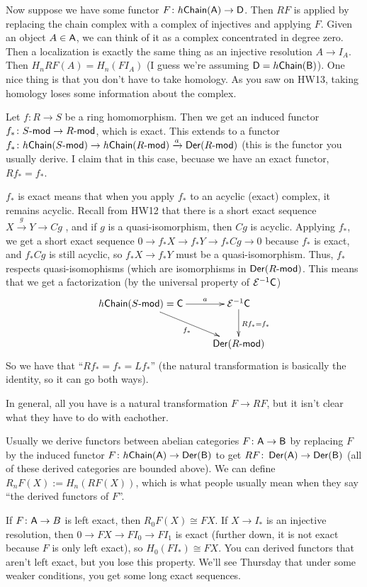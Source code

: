 Now suppose we have some functor $F\colon h\chain(\A)\to \D$. Then $RF$ is applied by replacing the chain complex with a complex of injectives and applying $F$. Given an object $A\in \A$, we can think of it as a complex concentrated in degree zero. Then a localization is exactly the same thing as an injective resolution $A\to I_A$. Then $H_nRF(A)=H_n(F I_A)$ (I guess we're assuming $\D=h\chain(\B)$). One nice thing is that you don't have to take homology. As you saw on HW13, taking homology loses some information about the complex.
\begin{example}
 Let $f\colon R\to S$ be a ring homomorphism. Then we get an induced functor $f_*\colon S\mod\to R\mod$, which is exact. This extends to a functor $f_*\colon h\chain(S\mod)\to h\chain(R\mod)\xrightarrow a \Der(R\mod)$ (this is the functor you usually derive. I claim that in this case, becuase we have an exact functor, $Rf_*=f_*$.
 
 $f_*$ is exact means that when you apply $f_*$ to an acyclic (exact) complex, it remains acyclic. Recall from HW12 that there is a short exact sequence $X\xrightarrow g Y\to Cg$ , and if $g$ is a quasi-isomorphism, then $Cg$ is acyclic. Applying $f_*$, we get a short exact sequence $0\to f_*X\to f_*Y\to f_*Cg\to 0$ because $f_*$ is exact, and $f_*Cg$ is still acyclic, so $f_*X\to f_*Y$ must be a quasi-isomorphism. Thus, $f_*$ respects quasi-isomophisms (which are isomorphisms in $\Der(R\mod)$. This means that we get a factorization (by the universal property of $\E^{-1}\C$)
 \[\xymatrix{
  h\chain(S\mod)=\C\ar[dr]_{f_*} \ar[r]^-a & \E^{-1}\C\ar[d]^{Rf_*=f_*}\\
   & \Der(R\mod)
 }\]
 So we have that ``$Rf_*=f_*=Lf_*$'' (the natural transformation is basically the identity, so it can go both ways).
\end{example}
In general, all you have is a natural transformation $F\to RF$, but it isn't clear what they have to do with eachother.
\begin{remark}
 Usually we derive functors between abelian categories $F\colon \A\to \B$ by replacing $F$ by the induced functor $F\colon h\chain(\A)\to \Der(\B)$ to get $RF\colon \Der(\A)\to \Der(\B)$ (all of these derived categories are bounded above). We can define $R_nF(X):=H_n(RF(X))$, which is what people usually mean when they say ``the derived functors of $F$''.
\end{remark}
\begin{remark}
 If $F\colon \A\to B$ is left exact, then $R_0F(X)\cong FX$. If $X\to I_*$ is an injective resolution, then $0\to FX\to FI_0\to FI_1$ is exact (further down, it is not exact because $F$ is only left exact), so $H_0(FI_*)\cong FX$. You can derived functors that aren't left exact, but you lose this property. We'll see Thursday that under some weaker conditions, you get some long exact sequences.
\end{remark}
